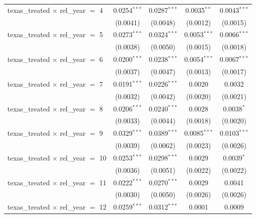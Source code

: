 \begin{tabular}{lcccc}
   texas\_treated $\times$ rel\_year $=$ 4      & 0.0254$^{***}$ & 0.0287$^{***}$ & 0.0035$^{**}$   & 0.0043$^{***}$\\   
                                                & (0.0041)       & (0.0048)       & (0.0012)        & (0.0015)\\   
   texas\_treated $\times$ rel\_year $=$ 5      & 0.0273$^{***}$ & 0.0324$^{***}$ & 0.0053$^{***}$  & 0.0066$^{***}$\\   
                                                & (0.0038)       & (0.0050)       & (0.0015)        & (0.0018)\\   
   texas\_treated $\times$ rel\_year $=$ 6      & 0.0200$^{***}$ & 0.0238$^{***}$ & 0.0054$^{***}$  & 0.0067$^{***}$\\   
                                                & (0.0037)       & (0.0047)       & (0.0013)        & (0.0017)\\   
   texas\_treated $\times$ rel\_year $=$ 7      & 0.0191$^{***}$ & 0.0226$^{***}$ & 0.0020          & 0.0032\\   
                                                & (0.0032)       & (0.0042)       & (0.0020)        & (0.0021)\\   
   texas\_treated $\times$ rel\_year $=$ 8      & 0.0206$^{***}$ & 0.0240$^{***}$ & 0.0028          & 0.0038$^{*}$\\   
                                                & (0.0033)       & (0.0044)       & (0.0018)        & (0.0020)\\   
   texas\_treated $\times$ rel\_year $=$ 9      & 0.0329$^{***}$ & 0.0389$^{***}$ & 0.0085$^{***}$  & 0.0103$^{***}$\\   
                                                & (0.0039)       & (0.0062)       & (0.0023)        & (0.0026)\\   
   texas\_treated $\times$ rel\_year $=$ 10     & 0.0253$^{***}$ & 0.0298$^{***}$ & 0.0029          & 0.0039$^{*}$\\   
                                                & (0.0036)       & (0.0051)       & (0.0022)        & (0.0022)\\   
   texas\_treated $\times$ rel\_year $=$ 11     & 0.0222$^{***}$ & 0.0270$^{***}$ & 0.0029          & 0.0041\\   
                                                & (0.0030)       & (0.0050)       & (0.0026)        & (0.0026)\\   
   texas\_treated $\times$ rel\_year $=$ 12     & 0.0259$^{***}$ & 0.0312$^{***}$ & 0.0001          & 0.0009\\   

\end{tabular}
